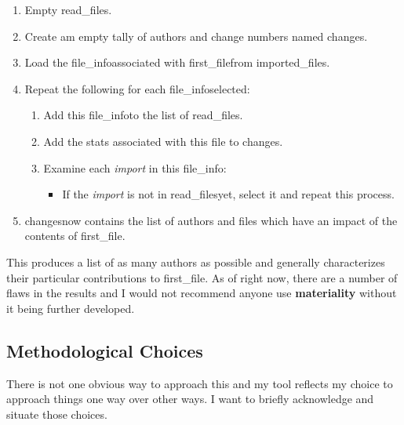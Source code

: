 \documentclass[a4paper,man,natbib,floatsintext]{apa6}
\begin{document}
\begin{enumerate}
    \item Empty \textlangle read\_files\textrangle. 
    \item Create am empty tally of authors and change numbers named \textlangle changes\textrangle.
    \item Load the \textlangle file\_info\textrangle associated with \textlangle first\_file\textrangle from \textlangle imported\_files\textrangle.
    \item Repeat the following for each \textlangle file\_info\textrangle selected:
    \begin{enumerate}
      \item Add this \textlangle file\_info\textrangle to the list of \textlangle read\_files\textrangle.
      \item Add the stats associated with this file to \textlangle changes\textrangle.
      \item Examine each \textit{import} in this \textlangle file\_info\textrangle:
      \begin{itemize}
        \item If the \textit{import} is not in \textlangle read\_files\textrangle yet, select it and repeat this process.
      \end{itemize}
    \end{enumerate}
    \item \textlangle changes\textrangle now contains the list of authors and files which have an impact of the contents of \textlangle first\_file\textrangle.
  \end{enumerate}
  \doublespace

  This produces a list of as many authors as possible and generally characterizes their particular contributions to \textlangle first\_file\textrangle. As of right now, there are a number of flaws in the results and I would not recommend anyone use \textbf{materiality} without it being further developed\footnotemark. 


  \subsection{Methodological Choices}
  There is not one obvious way to approach this and my tool reflects my choice to approach things one way over other ways. I want to briefly acknowledge and situate those choices.
\end{document}

